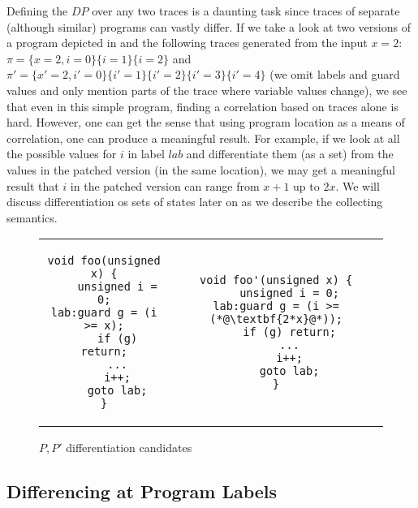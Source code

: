 Defining the $DP$ over any two traces is a daunting task since traces of separate (although similar) programs can vastly differ. If we take a look at two versions of a program depicted in  and the following traces generated from the input $x=2$: $\pi = \{x=2,i=0 \}\{i=1 \}\{i=2 \}$ and $\pi' = \{ x'=2,i'=0 \}\{ i'=1 \}\{ i'=2 \}\{ i'=3 \}\{i'=4\}$ (we omit labels and guard values and only mention parts of the trace where variable values change), we see that even in this simple program, finding a correlation based on traces alone is hard. However, one can get the sense that using program location as a means of correlation, one can produce a meaningful result. For example, if we look at all the possible values for $i$ in label $lab$ and differentiate them (as a set) from the values in the patched version (in the same location), we may get a meaningful result that $i$ in the patched version can range from $x+1$ up to $2x$. We will discuss differentiation os sets of states later on as we describe the collecting semantics.

\begin{figure}
\begin{tabular}{cc}
\centering
\begin{lstlisting}
void foo(unsigned x) {
    unsigned i = 0;
lab:guard g = (i >= x);
    if (g) return;
    ...
    i++;
    goto lab;
}
\end{lstlisting}
&
\begin{lstlisting}
void foo'(unsigned x) {
    unsigned i = 0;
lab:guard g = (i >= (*@\textbf{2*x}@*));
    if (g) return;
    ...
    i++;
    goto lab;
}
\end{lstlisting}
\end{tabular}
\caption{$P,P'$ differentiation candidates}
\end{figure}

\subsection{Differencing at Program Labels} 

